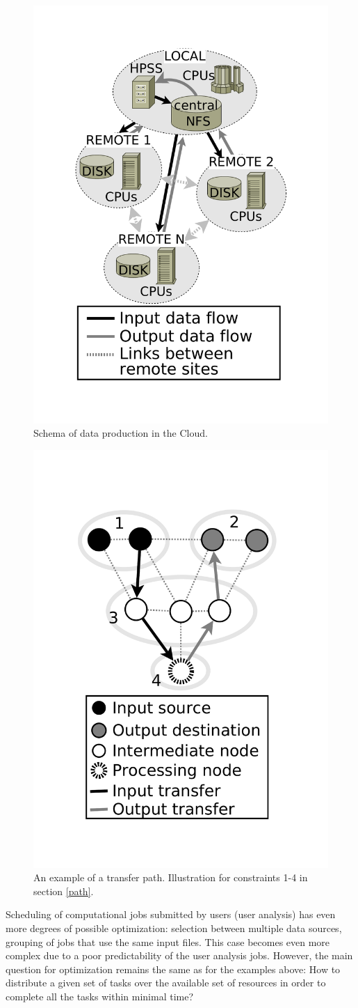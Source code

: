\documentclass[english]{ddny}
\begin{document}
\begin{figure}[h]
\centering
    \includegraphics[trim =30mm 30mm 30mm 30mm ,clip, width=.4\textwidth]{pic/Data_production_general_bw2.pdf}
    \caption{Schema of data production in the Cloud.}
    \label{fig:simulated grig}
\end{figure}

\begin{figure}[h]
\centering
    \includegraphics [trim =30mm 35mm 30mm 40mm ,clip, width=.4\textwidth]{pic/link_selection_bw3.pdf}	
    \caption{An example of a transfer path. Illustration for constraints 1-4 in section \ref{path}.  }
    \label{fig:path}
\end{figure}

Scheduling of computational jobs submitted by users (user analysis) has even more degrees of possible optimization: selection between multiple data sources, grouping of jobs that use the same input files. This case becomes even more complex due to a poor predictability of the user analysis jobs. However,  the main question for optimization remains the same as for the examples above: How to distribute a given set of tasks over the available set of resources in order to complete all the tasks within minimal time?
\end{document}
